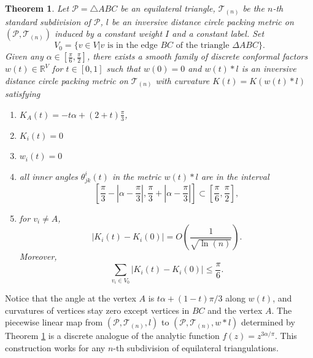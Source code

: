 \documentclass[12pt]{amsart}
\newtheorem{theorem}{Theorem}[section]
\def\R{\mathbb{R}}
\def\T{\mathcal{T}}
\begin{document}
\begin{theorem}
\label{dcm triangle} Let $\mathcal{P}=\triangle ABC$ be an
	equilateral triangle,  $\T_{(n)}$ be the $n$-th standard subdivision of
	$\mathcal{P}$, $l$ be an inversive distance circle packing metric on $(\mathcal{P}, \mathcal{T}_{(n)})$ induced by
 a constant weight $I$ and a constant label.  Set
	$$V_0=\{ v \in V | v \text{ is in the edge  $BC$ of the triangle }\Delta ABC\}.$$
	Given any $\alpha \in [\frac{\pi}{6},
	\frac{\pi}{2}]$, there exists a smooth family of discrete conformal factors $w(t) \in
	\R^V$ for $t\in [0,1]$ such that $w(0)=0$ and  $w(t)* l $ is an inversive distance circle packing metric
	 on $\T_{(n)}$ with curvature $K(t)=K(w(t)* l)$ satisfying
	\begin{enumerate}
	    \item 	   	 $K_A(t)= -t\alpha+(2+t)\frac{\pi}{3}$,
        \item 	    $K_i(t)=0$  
	
        \item 	    $w_i(t)=0$ 
	
	\item all inner angles $ \theta^i_{jk}(t)$ in the metric $w(t)* l$
	are in the interval  $$ [\frac{\pi}{3}-|\alpha-\frac{\pi}{3}|,
	\frac{\pi}{3}+|\alpha-\frac{\pi}{3}|] \subset [\frac{\pi}{6},
	\frac{\pi}{2}],$$
	
	
	\item   for $v_i\neq A$,
	$$|K_i(t) -K_i(0)| = O(\frac{1}{\sqrt{ \ln(n)}}).$$Moreover,
	\begin{equation}\label{totalcur} \sum_{v_i \in V_0}
		|K_i(t)-K_i(0)|\leq \frac{\pi}{6}.  \end{equation}
	\end{enumerate}
\end{theorem}

Notice that the angle at the vertex $A$ is $t\alpha+(1-t)\pi/3$ along $w(t)$, and curvatures of vertices stay zero except vertices in $BC$ and the vertex $A$.
The piecewise linear map from $(\mathcal{P}, \mathcal{T}_{(n)}, l)$ to $(\mathcal{P}, \mathcal{T}_{(n)}, w*l)$
determined by Theorem \ref{dcm triangle} is a discrete analogue of the analytic function $f(z) = z^{3\alpha/\pi}$. This construction works for any $n$-th subdivision of equilateral triangulations.
\end{document}
